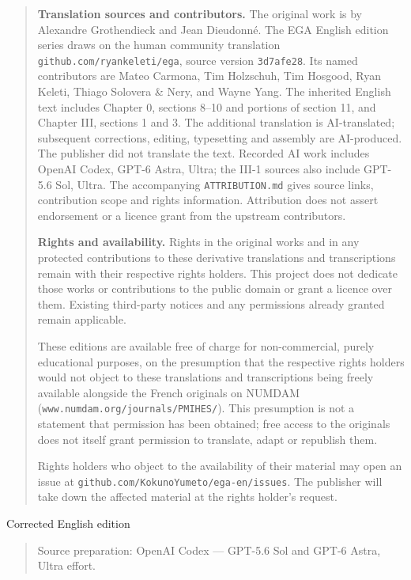 \begingroup
\small
\begin{quote}
\textbf{Translation sources and contributors.}
The original work is by Alexandre Grothendieck and Jean Dieudonn\'e.
The EGA English edition series draws on the human community translation
\texttt{github.com/ryankeleti/ega}, source version \texttt{3d7afe28}.
Its named contributors are Mateo Carmona, Tim Holzschuh, Tim Hosgood,
Ryan Keleti, Thiago Solovera \& Nery, and Wayne Yang.
The inherited English text includes Chapter 0, sections 8--10 and portions of section 11, and Chapter III, sections 1 and 3.
The additional translation is AI-translated; subsequent corrections, editing,
typesetting and assembly are AI-produced. The publisher did not translate
the text. Recorded AI work includes OpenAI Codex,
GPT-6 Astra, Ultra; the III-1 sources also include GPT-5.6 Sol, Ultra.
The accompanying \texttt{ATTRIBUTION.md} gives source links, contribution
scope and rights information. Attribution does not assert endorsement
or a licence grant from the upstream contributors.

\medskip
\textbf{Rights and availability.}
Rights in the original works and in any protected contributions to these
derivative translations and transcriptions remain with their respective
rights holders. This project does not dedicate those works or contributions
to the public domain or grant a licence over them. Existing third-party
notices and any permissions already granted remain applicable.

These editions are available free of charge for non-commercial, purely
educational purposes, on the presumption that the respective rights holders
would not object to these translations and transcriptions being freely
available alongside the French originals on NUMDAM
(\texttt{www.numdam.org/journals/PMIHES/}). This presumption is not a statement
that permission has been obtained; free access to the originals does not
itself grant permission to translate, adapt or republish them.

Rights holders who object to the availability of their material may open
an issue at \texttt{github.com/KokunoYumeto/ega-en/issues}. The publisher
will take down the affected material at the rights holder's request.
\end{quote}
\endgroup


\begin{center}
\large Corrected English edition
\end{center}

\begin{quote}\small
Source preparation: OpenAI Codex --- GPT-5.6 Sol and GPT-6 Astra,
Ultra effort.
\end{quote}

